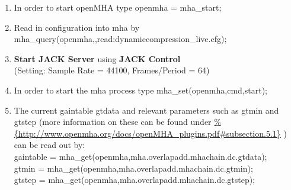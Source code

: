 \documentclass[11pt,a4paper,twoside]{article}
\newcommand{\+}{\discretionary{\mbox{\scriptsize$\hookleftarrow$}}{}{}}
\begin{document}
{{\begin{enumerate}
\begin{itemize}
\item \textcolor{orange}{\textbf{Linux}}: {\ttfamily addpath(\textquotesingle{}/usr/lib/openmha/mfiles\textquotesingle{})}
\item \textcolor{orange}{\textbf{Windows}}: {\ttfamily addpath(\textquotesingle{}C:\textbackslash Program Files\textbackslash openMHA\textbackslash mfiles\textquotesingle{})}
\item \textcolor{orange}{\textbf{macOS with Intel processor}}: {\ttfamily addpath(\textquotesingle{}/usr/local/lib/openmha/mfiles/\textquotesingle{})}
\item \textcolor{orange}{\textbf{macOS with ARM processor}}: {\ttfamily addpath(\textquotesingle{}/opt/homebrew/lib/openmha/mfiles/\textquotesingle{})}
\end{itemize}


\item In order to start openMHA type {\ttfamily openmha = mha\_start;} 
\item Read in configuration into mha by \\ {\ttfamily mha\_query(openmha,\textquotesingle{}\textquotesingle{},\textquotesingle{}read:dynamiccompression\_live.cfg\textquotesingle{});}
\item \textbf{Start JACK Server} using \textbf{JACK Control}\\ (Setting: Sample Rate = 44100, Frames/Period = 64)

\item In order to start the mha process type {\ttfamily mha\_set(openmha,\textquotesingle{}cmd\textquotesingle{},\textquotesingle{}start\textquotesingle{});}


\item The current gaintable {\ttfamily gtdata} and relevant parameters such as {\ttfamily gtmin} and {\ttfamily gtstep} (more information on these can be found under {\url{%
          {http://www.openmha.org/docs/openMHA_plugins.pdf#subsection.5.1}}}
\large) can be read out by: \\

{\ttfamily gaintable = mha\_get(openmha,\textquotesingle{}mha.overlapadd.mhachain.dc.gtdata\textquotesingle{});}\\
{\ttfamily gtmin = mha\_get(openmha,\textquotesingle{}mha.overlapadd.mhachain.dc.gtmin\textquotesingle{});}\\
{\ttfamily gtstep = mha\_get(openmha,\textquotesingle{}mha.overlapadd.mhachain.dc.gtstep\textquotesingle{});}




\end{enumerate}}}
\end{document}
